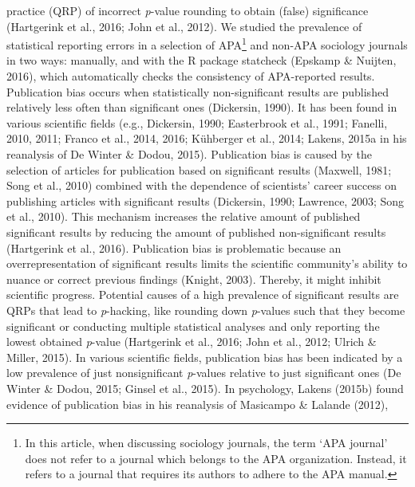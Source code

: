 \documentclass[
  12pt,
]{article}
\begin{document}
practice (QRP) of incorrect \emph{p}-value rounding to obtain (false)
significance (Hartgerink et al., 2016; John et al., 2012). We studied
the prevalence of statistical reporting errors in a selection of
APA\footnote{In this article, when discussing sociology journals, the
  term `APA journal' does not refer to a journal which belongs to the
  APA organization. Instead, it refers to a journal that requires its
  authors to adhere to the APA manual.} and non-APA sociology journals
in two ways: manually, and with the R package statcheck (Epskamp \&
Nuijten, 2016), which automatically checks the consistency of
APA-reported results.\\
\hspace*{0.333em}\hspace*{0.333em}\hspace*{0.333em}\hspace*{0.333em}Publication
bias occurs when statistically non-significant results are published
relatively less often than significant ones (Dickersin, 1990). It has
been found in various scientific fields (e.g., Dickersin, 1990;
Easterbrook et al., 1991; Fanelli, 2010, 2011; Franco et al., 2014,
2016; Kühberger et al., 2014; Lakens, 2015a in his reanalysis of De
Winter \& Dodou, 2015). Publication bias is caused by the selection of
articles for publication based on significant results (Maxwell, 1981;
Song et al., 2010) combined with the dependence of scientists' career
success on publishing articles with significant results (Dickersin,
1990; Lawrence, 2003; Song et al., 2010). This mechanism increases the
relative amount of published significant results by reducing the amount
of published non-significant results (Hartgerink et al., 2016).
Publication bias is problematic because an overrepresentation of
significant results limits the scientific community's ability to nuance
or correct previous findings (Knight, 2003). Thereby, it might inhibit
scientific progress. Potential causes of a high prevalence of
significant results are QRPs that lead to \emph{p}-hacking, like
rounding down \emph{p}-values such that they become significant or
conducting multiple statistical analyses and only reporting the lowest
obtained \emph{p}-value (Hartgerink et al., 2016; John et al., 2012;
Ulrich \& Miller, 2015). In various scientific fields, publication bias
has been indicated by a low prevalence of just nonsignificant
\emph{p}-values relative to just significant ones (De Winter \& Dodou,
2015; Ginsel et al., 2015). In psychology, Lakens (2015b) found evidence
of publication bias in his reanalysis of Masicampo \& Lalande (2012),
\end{document}
